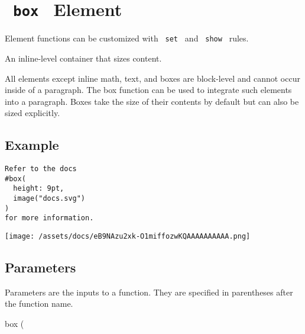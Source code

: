 \section{\texorpdfstring{\texttt{\ box\ } {{ Element
}}}{ box   Element }}\label{summary}

\label{element-tooltip}
Element functions can be customized with \texttt{\ set\ } and
\texttt{\ show\ } rules.

An inline-level container that sizes content.

All elements except inline math, text, and boxes are block-level and
cannot occur inside of a paragraph. The box function can be used to
integrate such elements into a paragraph. Boxes take the size of their
contents by default but can also be sized explicitly.

\subsection{Example}\label{example}

\begin{verbatim}
Refer to the docs
#box(
  height: 9pt,
  image("docs.svg")
)
for more information.
\end{verbatim}

\texttt{[image: /assets/docs/eB9NAzu2xk-O1miffozwKQAAAAAAAAAA.png]}

\subsection{\texorpdfstring{{ Parameters
}}{ Parameters }}\label{parameters}

\label{parameters-tooltip}
Parameters are the inputs to a function. They are specified in
parentheses after the function name.

{ box } (

